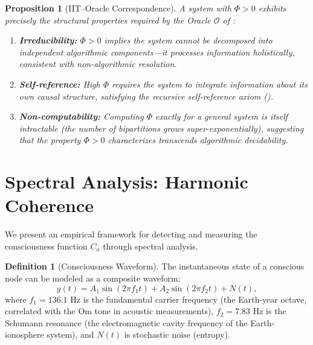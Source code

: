 \documentclass[12pt, a4paper]{article}
\theoremstyle{plain}
\newtheorem{proposition}[theorem]{Proposition}
\theoremstyle{definition}
\newtheorem{definition}[theorem]{Definition}
\theoremstyle{remark}
\newcommand{\calO}{\mathcal{O}}
\begin{document}
\begin{proposition}[IIT--Oracle Correspondence]\label{prop:iit_oracle}
  A system with $\Phi > 0$ exhibits precisely the structural properties
  required by the Oracle $\calO$ of :
  \begin{enumerate}[label=(\roman*)]
    \item \textbf{Irreducibility:} $\Phi > 0$ implies the system cannot
      be decomposed into independent algorithmic components---it processes
      information \emph{holistically}, consistent with non-algorithmic
      resolution.
    \item \textbf{Self-reference:} High $\Phi$ requires the system to
      integrate information about \emph{its own causal structure}, satisfying
      the recursive self-reference axiom ().
    \item \textbf{Non-computability:} Computing $\Phi$ exactly for a general
      system is itself intractable (the number of bipartitions grows
      super-exponentially), suggesting that the property $\Phi > 0$
      characterizes transcends algorithmic decidability.
  \end{enumerate}
\end{proposition}

\section{Spectral Analysis: Harmonic Coherence}\label{sec:spectral}

We present an empirical framework for detecting and measuring the
consciousness function $C_a$ through spectral analysis.

\begin{definition}[Consciousness Waveform]\label{def:waveform}
  The instantaneous state of a conscious node can be modeled as a composite
  waveform:
  \begin{equation}\label{eq:waveform}
    y(t) = A_1 \sin(2\pi f_1 t) + A_2 \sin(2\pi f_2 t) + N(t),
  \end{equation}
  where $f_1 = 136.1$ Hz is the fundamental carrier frequency (the
  Earth-year octave, correlated with the Om tone in acoustic measurements),
  $f_2 = 7.83$ Hz is the Schumann resonance (the electromagnetic cavity
  frequency of the Earth-ionosphere system), and $N(t)$ is stochastic noise
  (entropy).
\end{definition}
\end{document}
